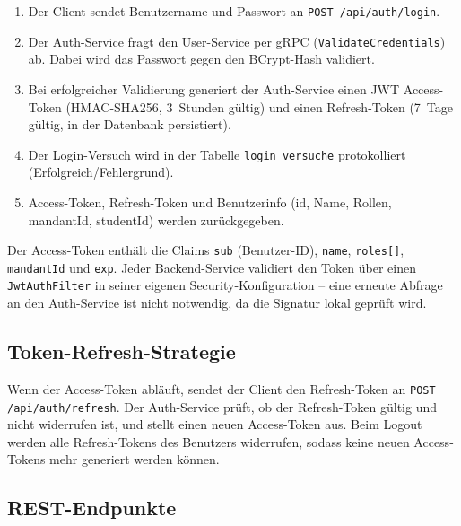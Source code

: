 \documentclass[12pt,a4paper,ngerman]{article}
\begin{document}
\begin{enumerate}
\item Der Client sendet Benutzername und Passwort an \texttt{POST /api/auth/login}.
\item Der Auth-Service fragt den User-Service per gRPC (\texttt{ValidateCredentials}) ab. Dabei wird das Passwort gegen den BCrypt-Hash validiert.
\item Bei erfolgreicher Validierung generiert der Auth-Service einen JWT Access-Token (HMAC-SHA256, 3~Stunden gültig) und einen Refresh-Token (7~Tage gültig, in der Datenbank persistiert).
\item Der Login-Versuch wird in der Tabelle \texttt{login\_versuche} protokolliert (Erfolgreich/Fehlergrund).
\item Access-Token, Refresh-Token und Benutzerinfo (id, Name, Rollen, mandantId, studentId) werden zurückgegeben.
\end{enumerate}

Der Access-Token enthält die Claims \texttt{sub} (Benutzer-ID), \texttt{name}, \texttt{roles[]}, \texttt{mandantId} und \texttt{exp}. Jeder Backend-Service validiert den Token über einen \texttt{JwtAuthFilter} in seiner eigenen Security-Konfiguration -- eine erneute Abfrage an den Auth-Service ist nicht notwendig, da die Signatur lokal geprüft wird.

\subsection{Token-Refresh-Strategie}

Wenn der Access-Token abläuft, sendet der Client den Refresh-Token an \texttt{POST /api/auth/refresh}. Der Auth-Service prüft, ob der Refresh-Token gültig und nicht widerrufen ist, und stellt einen neuen Access-Token aus. Beim Logout werden alle Refresh-Tokens des Benutzers widerrufen, sodass keine neuen Access-Tokens mehr generiert werden können.

\subsection{REST-Endpunkte}
\end{document}
